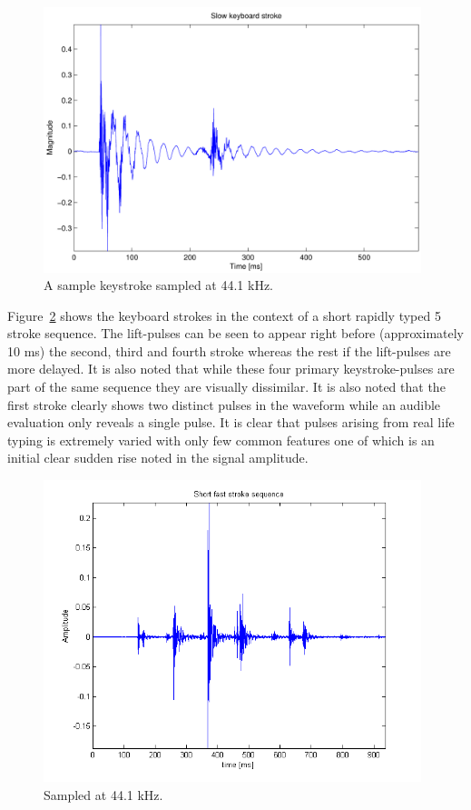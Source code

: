 \begin{figure}
  \begin{center}
    \includegraphics[width=110mm]{KeyboardStrokeSlowIntro.pdf}
    \caption{A sample keystroke sampled at 44.1 kHz.}\label{fig:KeyboardStrokeSlowIntro.pdf}
  \end{center}
\end{figure}

Figure~\ref{fig:shortFastSeq.png} shows the keyboard strokes in the context of a short rapidly typed 5 stroke sequence. The lift-pulses can be seen to appear right before (approximately 10 ms) the second, third and fourth stroke whereas the rest if the lift-pulses are more delayed. It is also noted that while these four primary keystroke-pulses are part of the same sequence they are visually dissimilar. It is also noted that the first stroke clearly shows two distinct pulses in the waveform while an audible evaluation only reveals a single pulse. It is clear that pulses arising from real life typing is extremely varied with only few common features one of which is an initial clear sudden rise noted in the signal amplitude.
  
\begin{figure}
  \begin{center}
    \includegraphics[width=110mm]{shortFastSeq.png}
    \caption{Sampled at 44.1 kHz.}\label{fig:shortFastSeq.png}
  \end{center}
\end{figure}

